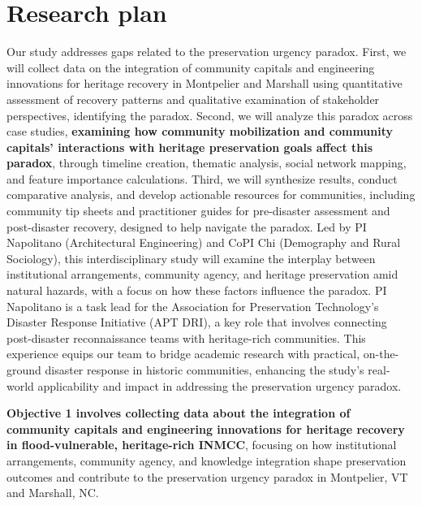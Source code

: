 \documentclass[11pt]{article}
\begin{document}
\section{Research plan}
Our study addresses gaps related to the preservation urgency paradox. 
First, we will collect data on the integration of community capitals and engineering innovations for heritage recovery in Montpelier and Marshall using quantitative assessment of recovery patterns and qualitative examination of stakeholder perspectives, identifying the paradox. 
Second, we will analyze this paradox across case studies, \textbf{examining how community mobilization and community capitals' interactions with heritage preservation goals affect this paradox}, through timeline creation, thematic analysis, social network mapping, and feature importance calculations. 
Third, we will synthesize results, conduct comparative analysis, and develop actionable resources for communities, including community tip sheets and practitioner guides for pre-disaster assessment and post-disaster recovery, designed to help navigate the paradox. 
Led by PI Napolitano (Architectural Engineering) and CoPI Chi (Demography and Rural Sociology), this interdisciplinary study will examine the interplay between institutional arrangements, community agency, and heritage preservation amid natural hazards, with a focus on how these factors influence the paradox.
PI Napolitano is a task lead for the Association for Preservation Technology's Disaster Response Initiative (APT DRI), a key role that involves connecting post-disaster reconnaissance teams with heritage-rich communities. 
This experience equips our team to bridge academic research with practical, on-the-ground disaster response in historic communities, enhancing the study's real-world applicability and impact in addressing the preservation urgency paradox.

\begin{tcolorbox}[colback=mycmykcolor, colframe=black, boxrule=1pt, coltext=black,left=1mm, right=1mm, top=1mm, bottom=1mm]
\textbf{Objective 1 involves collecting data about the integration of community capitals and engineering innovations for heritage recovery in flood-vulnerable, heritage-rich INMCC}, focusing on how institutional arrangements, community agency, and knowledge integration shape preservation outcomes and contribute to the preservation urgency paradox in Montpelier, VT and Marshall, NC. 
\end{tcolorbox}
\end{document}
